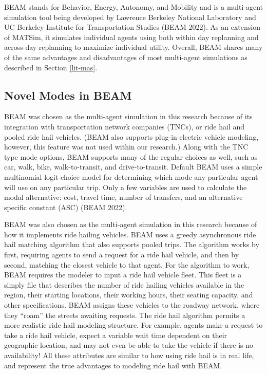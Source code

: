 \documentclass[12pt, oneside, openright]{byuthesis}
\begin{document}
BEAM stands for Behavior, Energy, Autonomy, and Mobility and is a multi-agent simulation tool being developed by Lawrence Berkeley National Laboratory and UC Berkeley Institute for Transportation Studies (BEAM 2022). As an extension of MATSim, it simulates individual agents using both within day replanning and across-day replanning to maximize individual utility. Overall, BEAM shares many of the same advantages and disadvantages of most multi-agent simulations as described in Section \ref{lit-mas}.

\hypertarget{novel-beam}{%
\subsection{Novel Modes in BEAM}\label{novel-beam}}

BEAM was chosen as the multi-agent simulation in this research because of its integration with transportation network companies (TNCs), or ride hail and pooled ride hail vehicles. (BEAM also supports plug-in electric vehicle modeling, however, this feature was not used within our research.) Along with the TNC type mode options, BEAM supports many of the regular choices as well, such as car, walk, bike, walk-to-transit, and drive-to-transit. Default BEAM uses a simple multinomial logit choice model for determining which mode any particular agent will use on any particular trip. Only a few variables are used to calculate the modal alternative: cost, travel time, number of transfers, and an alternative specific constant (ASC) (BEAM 2022).

BEAM was also chosen as the multi-agent simulation in this research because of how it implements ride hailing vehicles. BEAM uses a greedy asynchronous ride hail matching algorithm that also supports pooled trips. The algorithm works by first, requiring agents to send a request for a ride hail vehicle, and then by second, matching the closest vehicle to that agent. For the algorithm to work, BEAM requires the modeler to input a ride hail vehicle fleet. This fleet is a simply file that describes the number of ride hailing vehicles available in the region, their starting locations, their working hours, their seating capacity, and other specifications. BEAM assigns these vehicles to the roadway network, where they ``roam'' the streets awaiting requests. The ride hail algorithm permits a more realistic ride hail modeling structure. For example, agents make a request to take a ride hail vehicle, expect a variable wait time dependent on their geographic location, and may not even be able to take the vehicle if there is no availability! All these attributes are similar to how using ride hail is in real life, and represent the true advantages to modeling ride hail with BEAM.
\end{document}
